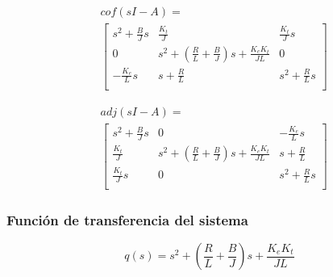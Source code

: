 \begin{equation}
  \begin{aligned}
    &cof(sI-A) =\\
    &\begin{bmatrix}
      s^2 + \frac{B}{J}s  &  \frac{K_t}{J}                                                  &  \frac{K_t}Js   \\
      0                   &  s^2 + \left(\frac{R}L + \frac{B}J\right)s + \frac{K_e K_t}{JL} &  0              \\
      -\frac{K_e}L s      &  s +\frac{R}L                                                   &  s^2+\frac{R}Ls \\
    \end{bmatrix}
  \end{aligned}
\end{equation}

\begin{equation}
  \begin{aligned}
    &adj(sI-A) =\\
    &\begin{bmatrix}
      s^2 + \frac{B}{J}s                                             &   
      0                                                              &   
     -\frac{K_e}L s                                                  \\  
      \frac{K_t}{J}                                                  & 
      s^2 + \left(\frac{R}L + \frac{B}J\right)s + \frac{K_e K_t}{JL} & 
      s +\frac{R}L                                                   \\
      \frac{K_t}Js                                                   &
      0                                                              &
      s^2+\frac{R}Ls                                                   \\
    \end{bmatrix}
  \end{aligned}
\end{equation}

\subsubsection{Función de transferencia del sistema}

\begin{equation*}
  q(s) = s^2 + \left(\frac{R}L + \frac{B}J\right)s + \frac{K_e K_t}{JL}
\end{equation*}

